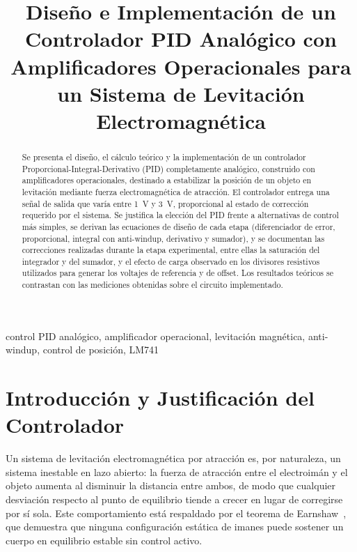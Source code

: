 \documentclass[conference]{IEEEtran}
\begin{document}
\title{Diseño e Implementación de un Controlador PID Analógico con Amplificadores Operacionales para un Sistema de Levitación Electromagnética}

\author{
}

\maketitle

\begin{abstract}
Se presenta el diseño, el cálculo teórico y la implementación de un controlador Proporcional-Integral-Derivativo (PID) completamente analógico, construido con amplificadores operacionales, destinado a estabilizar la posición de un objeto en levitación mediante fuerza electromagnética de atracción. El controlador entrega una señal de salida que varía entre 1~V y 3~V, proporcional al estado de corrección requerido por el sistema. Se justifica la elección del PID frente a alternativas de control más simples, se derivan las ecuaciones de diseño de cada etapa (diferenciador de error, proporcional, integral con anti-windup, derivativo y sumador), y se documentan las correcciones realizadas durante la etapa experimental, entre ellas la saturación del integrador y del sumador, y el efecto de carga observado en los divisores resistivos utilizados para generar los voltajes de referencia y de offset. Los resultados teóricos se contrastan con las mediciones obtenidas sobre el circuito implementado.
\end{abstract}

\begin{IEEEkeywords}
control PID analógico, amplificador operacional, levitación magnética, anti-windup, control de posición, LM741
\end{IEEEkeywords}

\section{Introducción y Justificación del Controlador}

Un sistema de levitación electromagnética por atracción es, por naturaleza, un sistema inestable en lazo abierto: la fuerza de atracción entre el electroimán y el objeto aumenta al disminuir la distancia entre ambos, de modo que cualquier desviación respecto al punto de equilibrio tiende a crecer en lugar de corregirse por sí sola. Este comportamiento está respaldado por el teorema de Earnshaw~\cite{earnshaw1842}, que demuestra que ninguna configuración estática de imanes puede sostener un cuerpo en equilibrio estable sin control activo.
\end{document}
